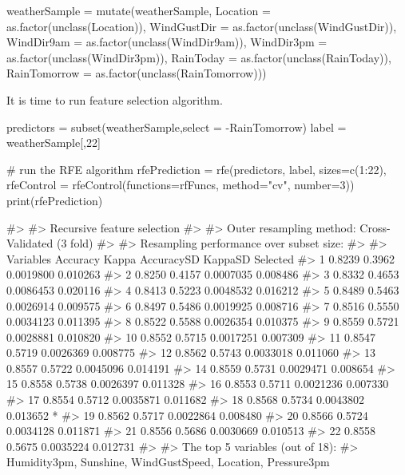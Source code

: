 \begin{Schunk}
\begin{Sinput}
weatherSample = mutate(weatherSample, Location = as.factor(unclass(Location)), 
          WindGustDir = as.factor(unclass(WindGustDir)),
          WindDir9am = as.factor(unclass(WindDir9am)), WindDir3pm = as.factor(unclass(WindDir3pm)),
          RainToday = as.factor(unclass(RainToday)), RainTomorrow = as.factor(unclass(RainTomorrow)))
\end{Sinput}
\end{Schunk}

It is time to run feature selection algorithm.

\begin{Schunk}
\begin{Sinput}
predictors = subset(weatherSample,select = -RainTomorrow)
label = weatherSample[,22]

# run the RFE algorithm
rfePrediction = rfe(predictors, label, sizes=c(1:22), 
                    rfeControl = rfeControl(functions=rfFuncs, method="cv", number=3))
print(rfePrediction)
\end{Sinput}
\begin{Soutput}
#> 
#> Recursive feature selection
#> 
#> Outer resampling method: Cross-Validated (3 fold) 
#> 
#> Resampling performance over subset size:
#> 
#>  Variables Accuracy  Kappa AccuracySD  KappaSD Selected
#>          1   0.8239 0.3962  0.0019800 0.010263         
#>          2   0.8250 0.4157  0.0007035 0.008486         
#>          3   0.8332 0.4653  0.0086453 0.020116         
#>          4   0.8413 0.5223  0.0048532 0.016212         
#>          5   0.8489 0.5463  0.0026914 0.009575         
#>          6   0.8497 0.5486  0.0019925 0.008716         
#>          7   0.8516 0.5550  0.0034123 0.011395         
#>          8   0.8522 0.5588  0.0026354 0.010375         
#>          9   0.8559 0.5721  0.0028881 0.010820         
#>         10   0.8552 0.5715  0.0017251 0.007309         
#>         11   0.8547 0.5719  0.0026369 0.008775         
#>         12   0.8562 0.5743  0.0033018 0.011060         
#>         13   0.8557 0.5722  0.0045096 0.014191         
#>         14   0.8559 0.5731  0.0029471 0.008654         
#>         15   0.8558 0.5738  0.0026397 0.011328         
#>         16   0.8553 0.5711  0.0021236 0.007330         
#>         17   0.8554 0.5712  0.0035871 0.011682         
#>         18   0.8568 0.5734  0.0043802 0.013652        *
#>         19   0.8562 0.5717  0.0022864 0.008480         
#>         20   0.8566 0.5724  0.0034128 0.011871         
#>         21   0.8556 0.5686  0.0030669 0.010513         
#>         22   0.8558 0.5675  0.0035224 0.012731         
#> 
#> The top 5 variables (out of 18):
#>    Humidity3pm, Sunshine, WindGustSpeed, Location, Pressure3pm
\end{Soutput}
\end{Schunk}


